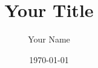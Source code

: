 




\documentclass[final,10pt]{beamer}
\boldmath
\usepackage{amsmath,amsthm, amssymb}
\usepackage[orientation=landscape,size=a1,scale=1]{beamerposter}
\usepackage{palatino}
\newcommand{\ReplaceWithContent}{\vspace{12cm}} 
\newlength{\columnheight} 


  \title{Your Title}

  \setlength{\columnheight}{52cm}

  \author{Your Name}
  \date{\today}
  \newcommand{\department}{Department of Mathematics}
  \newcommand{\email}{youremail@ufl.edu}




